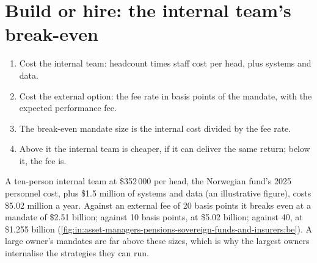 \section{Build or hire: the internal team's break-even}

\begin{method}\label{met:in:asset-managers-pensions-sovereign-funds-and-insurers:be}
\begin{enumerate}
\item Cost the internal team: headcount times staff cost per head, plus systems and data.
\item Cost the external option: the fee rate in basis points of the mandate, with the expected performance fee.
\item The break-even mandate size is the internal cost divided by the fee rate.
\item Above it the internal team is cheaper, if it can deliver the same return; below it, the fee is.
\end{enumerate}
\end{method}

\begin{example}\label{ex:in:asset-managers-pensions-sovereign-funds-and-insurers:team}
A ten-person internal team at \$352\,000 per head, the Norwegian fund's 2025 personnel cost, plus \$1.5 million of systems
and data (an illustrative figure), costs \$5.02 million a year. Against an external fee of 20 basis points it breaks even at a
mandate of \$2.51 billion; against 10 basis points, at \$5.02 billion; against 40, at \$1.255 billion
(\cref{fig:in:asset-managers-pensions-sovereign-funds-and-insurers:be}). A large owner's mandates are far above these
sizes, which is why the largest owners internalise the strategies they can run.
\end{example}

